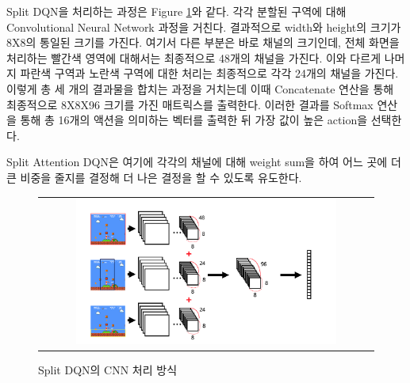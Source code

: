 Split DQN을 처리하는 과정은 Figure \ref{fig:split_dqn}와 같다. 
각각 분할된 구역에 대해 Convolutional Neural Network 과정을 거친다. 
결과적으로 width와 height의 크기가 8X8의 통일된 크기를 가진다. 
여기서 다른 부분은 바로 채널의 크기인데, 전체 화면을 처리하는 빨간색 영역에 대해서는 최종적으로 48개의 채널을 가진다.
이와 다르게 나머지 파란색 구역과 노란색 구역에 대한 처리는 최종적으로 각각 24개의 채널을 가진다. 
이렇게 총 세 개의 결과물을 합치는 과정을 거치는데 이때 Concatenate 연산을 통해 최종적으로 8X8X96 크기를 가진 매트릭스를 출력한다. 
이러한 결과를 Softmax 연산을 통해 총 16개의 액션을 의미하는 벡터를 출력한 뒤 가장 값이 높은 action을 선택한다. 

Split Attention DQN은 여기에 각각의 채널에 대해 weight sum을 하여 어느 곳에 더 큰 비중을 줄지를 결정해 더 나은 결정을 할 수 있도록 유도한다. 


\begin{figure}[]
\begin{center}
\begin{tabular}{c}
     \includegraphics[width=0.8\textwidth]{FIG/split_dqn.png} \\
\end{tabular}
\caption{
	Split DQN의 CNN 처리 방식
}
\label{fig:split_dqn}
\end{center}
\end{figure}

